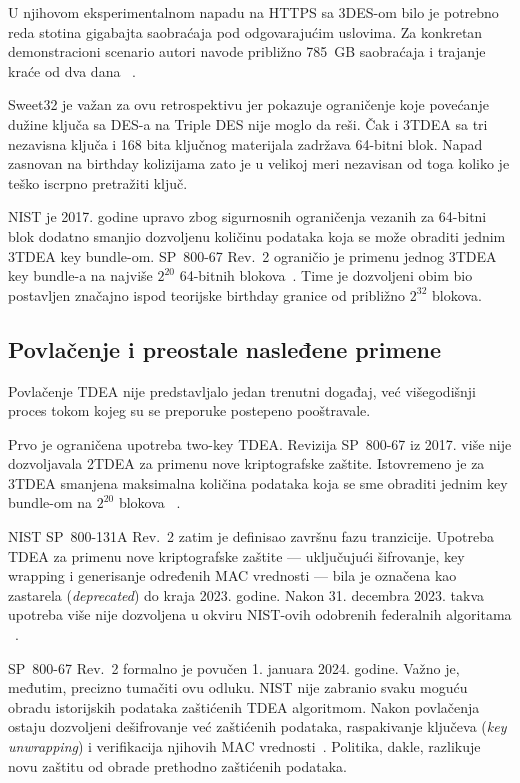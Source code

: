 U njihovom eksperimentalnom napadu na HTTPS sa 3DES-om bilo je potrebno
reda stotina gigabajta saobraćaja pod odgovarajućim uslovima. Za
konkretan demonstracioni scenario autori navode približno 785~GB
saobraćaja i trajanje kraće od dva dana
~\cite{sweet32-2016}.

Sweet32 je važan za ovu retrospektivu jer pokazuje ograničenje koje
povećanje dužine ključa sa DES-a na Triple DES nije moglo da reši.
Čak i 3TDEA sa tri nezavisna ključa i 168 bita ključnog materijala
zadržava 64-bitni blok. Napad zasnovan na birthday kolizijama zato je
u velikoj meri nezavisan od toga koliko je teško iscrpno pretražiti
ključ.

NIST je 2017. godine upravo zbog sigurnosnih ograničenja vezanih za
64-bitni blok dodatno smanjio dozvoljenu količinu podataka koja se može
obraditi jednim 3TDEA key bundle-om. SP~800-67 Rev.~2 ograničio je
primenu jednog 3TDEA key bundle-a na najviše
$2^{20}$
64-bitnih blokova~\cite{sp800-67r2}. Time je dozvoljeni obim bio
postavljen značajno ispod teorijske birthday granice od približno
$2^{32}$ blokova.


\subsection{Povlačenje i preostale nasleđene primene}
\label{subsec:tdea_withdrawal}

Povlačenje TDEA nije predstavljalo jedan trenutni događaj, već
višegodišnji proces tokom kojeg su se preporuke postepeno pooštravale.

Prvo je ograničena upotreba two-key TDEA. Revizija SP~800-67 iz 2017.
više nije dozvoljavala 2TDEA za primenu nove kriptografske zaštite.
Istovremeno je za 3TDEA smanjena maksimalna količina podataka koja se
sme obraditi jednim key bundle-om na $2^{20}$ blokova
~\cite{sp800-67r2}.

NIST SP~800-131A Rev.~2 zatim je definisao završnu fazu tranzicije.
Upotreba TDEA za primenu nove kriptografske zaštite --- uključujući
šifrovanje, key wrapping i generisanje određenih MAC vrednosti --- bila
je označena kao zastarela (\emph{deprecated}) do kraja 2023. godine.
Nakon 31. decembra 2023. takva upotreba više nije dozvoljena u okviru
NIST-ovih odobrenih federalnih algoritama
~\cite{sp800-131ar2,tdea-withdrawal-2023}.

SP~800-67 Rev.~2 formalno je povučen
1. januara 2024. godine.
Važno je, međutim, precizno tumačiti ovu odluku. NIST nije zabranio
svaku moguću obradu istorijskih podataka zaštićenih TDEA algoritmom.
Nakon povlačenja ostaju dozvoljeni dešifrovanje već zaštićenih podataka,
raspakivanje ključeva (\emph{key unwrapping}) i verifikacija njihovih
MAC vrednosti~\cite{tdea-withdrawal-2023}. Politika, dakle, razlikuje
novu zaštitu od obrade prethodno zaštićenih podataka.


